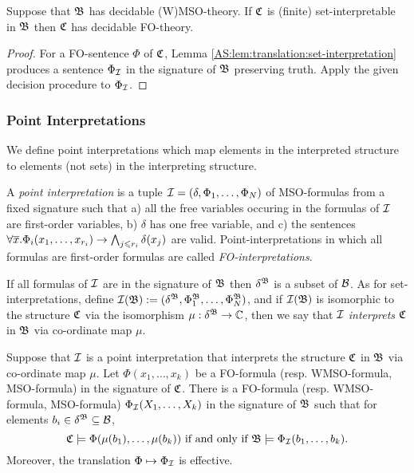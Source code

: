 

\begin{lemma} \label{AS:lem:set-interpretation:decidability}
Suppose that $\mathfrak{B}$ has decidable (W)MSO-theory. If $\mathfrak{C}$ is (finite) set-interpretable 
in $\mathfrak{B}$ then $\mathfrak{C}$ has decidable FO-theory. 
\end{lemma}
\begin{proof}
For a FO-sentence $\Phi$ of $\mathfrak{C}$, Lemma \ref{AS:lem:translation:set-interpretation} produces a sentence $\Phi_{\mathcal I}$ in the signature of $\mathfrak{B}$ preserving truth. 
Apply the given decision procedure to $\Phi_{\mathcal I}$. 
\end{proof}

\subsubsection{Point Interpretations}

We define point interpretations which map elements in the interpreted structure to elements (not sets) in the interpreting structure.

\begin{definition}
A \emph{point interpretation} is a tuple  ${\mathcal I} = (\delta, \Phi_1, \dots, \Phi_N)$ of MSO-formulas from a fixed signature such that a) all the free variables occuring in the formulas of ${\mathcal I}$ are first-order variables, b) $\delta$ has one free variable, and c) the sentences $\forall \mbox{$\overline {x}$}. \Phi_i(x_1, \dots, x_{r_i}) \to \bigwedge_{j \leqslant r_i} \delta(x_j)$ are valid. Point-interpretations in which all formulas are first-order formulas are called \emph{FO-interpretations}.
\end{definition}

If all formulas of ${\mathcal I}$ are in the signature of $\mathfrak{B}$ then $\delta^{\mathfrak{B}}$ is a subset of ${\mathcal B}$. As for set-interpretations, define 
${\mathcal I}(\mathfrak{B}) := (\delta^{\mathfrak{B}}, \Phi_1^{\mathfrak{B}}, \dots, \Phi_N^{\mathfrak{B}})$, and if ${\mathcal I}(\mathfrak{B})$ is isomorphic to the structure $\mathfrak{C}$ via the isomorphism 
$\mu:\delta^{\mathfrak{B}} \to \mathbb{C}$, then we say that ${\mathcal I}$ \emph{interprets} $\mathfrak{C}$ in $\mathfrak{B}$ via co-ordinate map $\mu$. 


\begin{lemma} \label{AS:lem:translation:point-interpretation} 
Suppose that ${\mathcal I}$ is a point interpretation that interprets the structure $\mathfrak{C}$ in $\mathfrak{B}$ via co-ordinate map $\mu$.
Let $\Phi(x_1,\dots,x_k)$ be a FO-formula (resp. WMSO-formula, MSO-formula) in the signature of $\mathfrak{C}$. 
There is a FO-formula (resp. WMSO-formula, MSO-formula) $\Phi_{\mathcal I}(X_1,\dots,X_k)$ in the signature of $\mathfrak{B}$ such that for elements
$b_i \in \delta^{\mathfrak{B}} \subseteq {\mathcal B}$,
\[
\mathfrak{C} \models \Phi(\mu(b_1),\dots,\mu(b_k)) \mbox{ if and only if } \mathfrak{B} \models \Phi_{\mathcal I}(b_1,\dots,b_k).
\]
Moreover, the translation $\Phi \mapsto \Phi_{\mathcal I}$ is effective.
\end{lemma}

